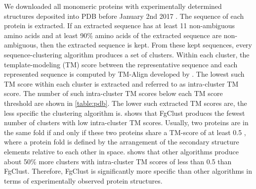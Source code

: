 \documentclass[11pt,letterpaper]{article}
\begin{document}
We downloaded all monomeric proteins with experimentally determined structures deposited into PDB before January 2nd 2017 \citep{berman2006protein}.
The sequence of each protein is extracted.
If an extracted sequence has at least 11 non-ambiguous amino acids and at least 90\% amino acids of the extracted sequence are non-ambiguous, then the extracted sequence is kept.
From these kept sequences, every sequence-clustering algorithm produces a set of clusters.
Within each cluster, the template-modeling (TM) score between the representative sequence and each represented sequence is computed by TM-Align developed by \citet{zhang2005tm}.
The lowest such TM score within each cluster is extracted and referred to as intra-cluster TM score.
The number of such intra-cluster TM scores below each TM score threshold are shown in \cref{table:pdb}.
The lower such extracted TM scores are, the less specific the clustering algorithm is.
 shows that FgClust produces the fewest number of clusters with low intra-cluster TM scores.
Usually, two proteins are in the same fold if and only if these two proteins share a TM-score of at least 0.5 \citep{xu2010significant}, where a protein fold is defined by the arrangement of the secondary structure elements relative to each other in space.
 shows that other algorithms produce about 50\% more clusters with intra-cluster TM scores of less than 0.5 than FgClust.
Therefore, FgClust is significantly more specific than other algorithms in terms of experimentally observed protein structures.
\end{document}
